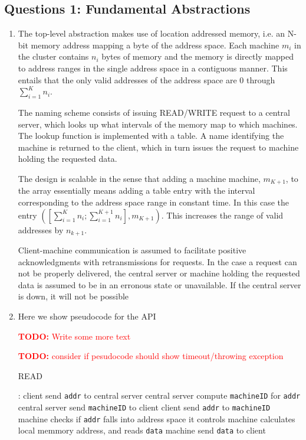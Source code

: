 \documentclass[11pt,a4paper,english]{article}
\newcommand{\todo}[1]{\textcolor{red}{\textbf{TODO: }#1}}
\begin{document}
\subsection{Questions 1: Fundamental Abstractions}
\begin{enumerate}
\item{
The top-level abstraction makes use of location addressed memory, i.e. an N-bit memory address mapping a byte of the address space. Each machine $m_i$ in the cluster contains $n_i$ bytes of memory and the memory is directly mapped to address ranges in the single address space in a contiguous manner. This entails that the only valid addresses of the address space are 0 through $\sum_{i=1}^{K} n_{i}$.

The naming scheme consists of issuing READ/WRITE request to a central server, which looks up what intervals of the memory map to which machines. The lookup function is implemented with a table. A name identifying the machine is returned to the client, which in turn issues the request to machine holding the requested data.

The design is scalable in the sense that adding a machine machine, $m_{K+1}$, to the array essentially means adding a table entry with the interval corresponding to the address space range in constant time. In this case the entry $([\sum_{i=1}^{K} n_{i}; \sum_{i=1}^{K+1} n_{i}], m_{K+1})$. This increases the range of valid addresses by $n_{k+1}$.

Client-machine communication is assumed to facilitate positive acknowledgments with retransmissions for requests. In the case a request can not be properly delivered, the central server or machine holding the requested data is assumed to be in an erronous state or unavailable. If the central server is down, it will not be possible}

\item Here we show pseudocode for the API

\todo{Write some more text}

\todo{consider if pesudocode should show timeout/throwing exception}

\begin{algorithm}[H]
\caption{READ}
\begin{algorithmic}[1]
:
\State client send \texttt{addr} to central server
\State central server compute \texttt{machineID} for \texttt{addr}
\State central server send \texttt{machineID} to client
\smallskip
\State client send \texttt{addr} to \texttt{machineID}
\State machine checks if \texttt{addr} falls into address space it controls
\State machine calculates local memmory address, and reads \texttt{data}
\State machine send \texttt{data} to client
\EndProcedure
\end{algorithmic}
\end{algorithm}


\end{enumerate}
\end{document}
